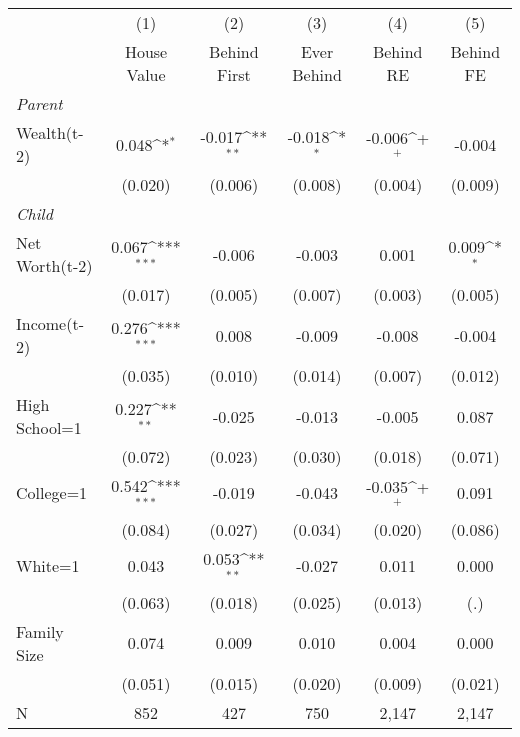 {
\def\sym#1{\ifmmode^{#1}\else\(^{#1}\)\fi}
\begin{tabular}{l*{5}{c}}
\toprule
                &\multicolumn{1}{c}{(1)}&\multicolumn{1}{c}{(2)}&\multicolumn{1}{c}{(3)}&\multicolumn{1}{c}{(4)}&\multicolumn{1}{c}{(5)}\\
                &\multicolumn{1}{c}{House Value}&\multicolumn{1}{c}{Behind First}&\multicolumn{1}{c}{Ever Behind}&\multicolumn{1}{c}{Behind RE}&\multicolumn{1}{c}{Behind FE}\\
\midrule
\textit{Parent} &                  &                  &                  &                  &                  \\
\;Wealth(t-2)   &    0.048\sym{*}  &   -0.017\sym{**} &   -0.018\sym{*}  &   -0.006\sym{+}  &   -0.004         \\
                &  (0.020)         &  (0.006)         &  (0.008)         &  (0.004)         &  (0.009)         \\
\textit{Child}  &                  &                  &                  &                  &                  \\
\;Net Worth(t-2)&    0.067\sym{***}&   -0.006         &   -0.003         &    0.001         &    0.009\sym{*}  \\
                &  (0.017)         &  (0.005)         &  (0.007)         &  (0.003)         &  (0.005)         \\
\;Income(t-2)   &    0.276\sym{***}&    0.008         &   -0.009         &   -0.008         &   -0.004         \\
                &  (0.035)         &  (0.010)         &  (0.014)         &  (0.007)         &  (0.012)         \\
\;High School=1 &    0.227\sym{**} &   -0.025         &   -0.013         &   -0.005         &    0.087         \\
                &  (0.072)         &  (0.023)         &  (0.030)         &  (0.018)         &  (0.071)         \\
\;College=1     &    0.542\sym{***}&   -0.019         &   -0.043         &   -0.035\sym{+}  &    0.091         \\
                &  (0.084)         &  (0.027)         &  (0.034)         &  (0.020)         &  (0.086)         \\
\;White=1       &    0.043         &    0.053\sym{**} &   -0.027         &    0.011         &    0.000         \\
                &  (0.063)         &  (0.018)         &  (0.025)         &  (0.013)         &      (.)         \\
\;Family Size   &    0.074         &    0.009         &    0.010         &    0.004         &    0.000         \\
                &  (0.051)         &  (0.015)         &  (0.020)         &  (0.009)         &  (0.021)         \\
\midrule
N               &      852         &      427         &      750         &    2,147         &    2,147         \\
\bottomrule
\end{tabular}
}
